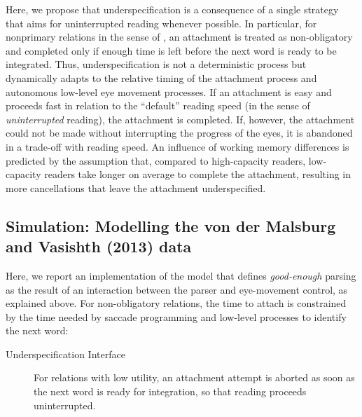 \documentclass{cambridge7A}\usepackage[]{graphicx}\usepackage[]{color}
\begin{document}
Here, we propose that underspecification is a consequence of a single strategy that aims for uninterrupted reading whenever possible.
In particular, for nonprimary relations in the sense of \cite{FrazierClifton1997}, an attachment is treated as non-obligatory and completed only if enough time is left before the next word is ready to be integrated.
Thus, underspecification is not a deterministic process but dynamically adapts to the relative timing of the attachment process and autonomous low-level eye movement processes. If an attachment is easy and proceeds fast in relation to the ``default'' reading speed (in the sense of \emph{uninterrupted} reading), the attachment is completed. If, however, the attachment could not be made without interrupting the progress of the eyes, it is abandoned in a trade-off with reading speed. 
An influence of working memory differences is predicted by the assumption that, compared to high-capacity readers, low-capacity readers take longer on average to complete the attachment, resulting in more cancellations that leave the attachment underspecified.



\subsection{Simulation: Modelling the von der Malsburg and Vasishth (2013) data}
Here, we report an implementation of the model that defines \emph{good-enough} parsing as the result of an interaction between the parser and eye-movement control, as explained above. For non-obligatory relations, the time to attach is constrained by the time needed by saccade programming and low-level processes to identify the next word:

\begin{description}
  \item[Underspecification Interface] For relations with low utility, an attachment attempt is aborted as soon as the next word is ready for integration, so that reading proceeds uninterrupted.
\end{description}
\end{document}
